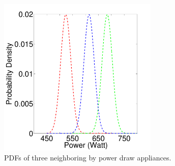\begin{figure}[h]
\centering
\includegraphics[width=3in]{figs/pdfRedd.pdf}
\caption{PDFs of three neighboring by power draw appliances.}
\label{fig_realPowerPDF}
\end{figure}

